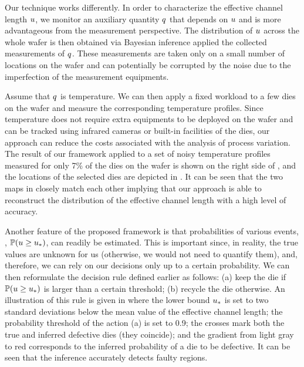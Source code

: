 Our technique works differently.
In order to characterize the effective channel length $u$, we monitor an auxiliary quantity $q$ that depends on $u$ and is more advantageous from the measurement perspective.
The distribution of $u$ across the whole wafer is then obtained via Bayesian inference \cite{gelman2004} applied the collected measurements of $q$.
These measurements are taken only on a small number of locations on the wafer and can potentially be corrupted by the noise due to the imperfection of the measurement equipments.

Assume that $q$ is temperature.
We can then apply a fixed workload to a few dies on the wafer and measure the corresponding temperature profiles.
Since temperature does not require extra equipments to be deployed on the wafer and can be tracked using infrared cameras \cite{mesa-martinez2007} or built-in facilities of the dies, our approach can reduce the costs associated with the analysis of process variation.
The result of our framework applied to a set of noisy temperature profiles measured for only 7\% of the dies on the wafer is shown on the right side of , and the locations of the selected dies are depicted in .
It can be seen that the two maps in  closely match each other implying that our approach is able to reconstruct the distribution of the effective channel length with a high level of accuracy.

Another feature of the proposed framework is that probabilities of various events, \eg, $\mathbb{P}(u \geq u_*)$, can readily be estimated.
This is important since, in reality, the true values are unknown for us (otherwise, we would not need to quantify them), and, therefore, we can rely on our decisions only up to a certain probability.
We can then reformulate the decision rule defined earlier as follows: (a) keep the die if $\mathbb{P}(u \geq u_*)$ is larger than a certain threshold; (b) recycle the die otherwise.
An illustration of this rule is given in  where the lower bound $u_*$ is set to two standard deviations below the mean value of the effective channel length; the probability threshold of the action (a) is set to 0.9; the crosses mark both the true and inferred defective dies (they coincide); and the gradient from light gray to red corresponds to the inferred probability of a die to be defective. It can be seen that the inference accurately detects faulty regions.


